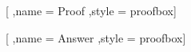 [
    ,name = Proof
    ,style = proofbox]
\renewenvironment{proof}
{\vspace{-\vlengthBetweenColoredBoxes}\begin{proof*}}{\end{proof*}}

[
    ,name = Answer
    ,style = proofbox]
\newenvironment{answer}
{\vspace{-\vlengthBetweenColoredBoxes}\begin{answer*}}{\end{answer*}}

